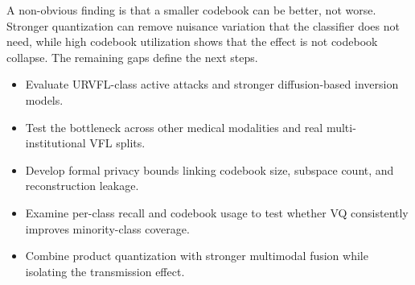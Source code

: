 \documentclass{article}
\begin{document}
A non-obvious finding is that a smaller codebook can be better, not worse. Stronger quantization can remove nuisance variation that the classifier does not need, while high codebook utilization shows that the effect is not codebook collapse. The remaining gaps define the next steps.
\begin{itemize}
    \item Evaluate URVFL-class active attacks and stronger diffusion-based inversion models.
    \item Test the bottleneck across other medical modalities and real multi-institutional VFL splits.
    \item Develop formal privacy bounds linking codebook size, subspace count, and reconstruction leakage.
    \item Examine per-class recall and codebook usage to test whether VQ consistently improves minority-class coverage.
    \item Combine product quantization with stronger multimodal fusion while isolating the transmission effect.
\end{itemize}



\end{document}
